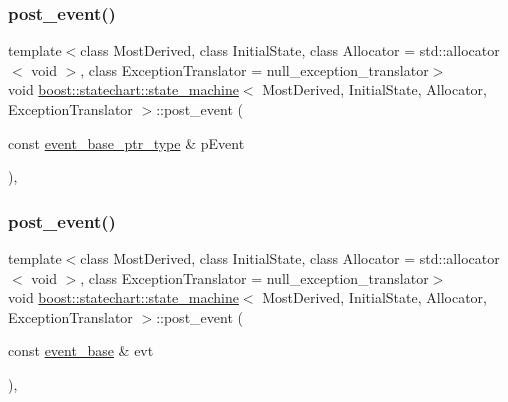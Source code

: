 \mbox{\label{classboost_1_1statechart_1_1state__machine_ab0b16e3139d505968f463861913850ed}} 
\subsubsection{\texorpdfstring{post\+\_\+event()}{post\_event()}\hspace{0.1cm}{\footnotesize\ttfamily [1/2]}}
{\footnotesize\ttfamily template$<$class Most\+Derived, class Initial\+State, class Allocator = std\+::allocator$<$ void $>$, class Exception\+Translator = null\+\_\+exception\+\_\+translator$>$ \\
void \mbox{\hyperlink{classboost_1_1statechart_1_1state__machine}{boost\+::statechart\+::state\+\_\+machine}}$<$ Most\+Derived, Initial\+State, Allocator, Exception\+Translator $>$\+::post\+\_\+event (\begin{DoxyParamCaption}\item[{const \mbox{\hyperlink{classboost_1_1statechart_1_1state__machine_aa2f1c567e2d1a66786d28769312dfa08}{event\+\_\+base\+\_\+ptr\+\_\+type}} \&}]{p\+Event }\end{DoxyParamCaption})\hspace{0.3cm}{\ttfamily [inline]}, {\ttfamily [protected]}}

\mbox{\label{classboost_1_1statechart_1_1state__machine_affa0211ad348886e2f01e8ec1cc55654}} 
\subsubsection{\texorpdfstring{post\+\_\+event()}{post\_event()}\hspace{0.1cm}{\footnotesize\ttfamily [2/2]}}
{\footnotesize\ttfamily template$<$class Most\+Derived, class Initial\+State, class Allocator = std\+::allocator$<$ void $>$, class Exception\+Translator = null\+\_\+exception\+\_\+translator$>$ \\
void \mbox{\hyperlink{classboost_1_1statechart_1_1state__machine}{boost\+::statechart\+::state\+\_\+machine}}$<$ Most\+Derived, Initial\+State, Allocator, Exception\+Translator $>$\+::post\+\_\+event (\begin{DoxyParamCaption}\item[{const \mbox{\hyperlink{classboost_1_1statechart_1_1event__base}{event\+\_\+base}} \&}]{evt }\end{DoxyParamCaption})\hspace{0.3cm}{\ttfamily [inline]}, {\ttfamily [protected]}}

